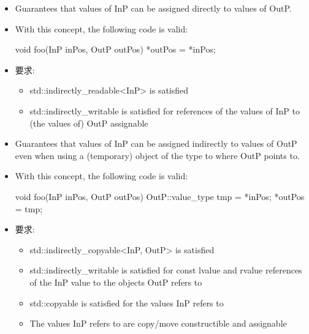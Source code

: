 
\begin{itemize}
\item
Guarantees that values of InP can be assigned directly to values of OutP.

\item
With this concept, the following code is valid:

\begin{cpp}
void foo(InP inPos, OutP outPos) {
	*outPos = *inPos;
}
\end{cpp}

\item
要求:
\begin{itemize}
\item
std::indirectly\_readable<InP> is satisfied

\item
std::indirectly\_writable is satisfied for references of the values of InP to (the values of) OutP assignable
\end{itemize}
\end{itemize}


\begin{itemize}
\item
Guarantees that values of InP can be assigned indirectly to values of OutP even when using a (temporary) object of the type to where OutP points to.

\item
With this concept, the following code is valid:

\begin{cpp}
void foo(InP inPos, OutP outPos) {
	OutP::value_type tmp = *inPos;
	*outPos = tmp;
}
\end{cpp}

\item
要求:
\begin{itemize}
\item
std::indirectly\_copyable<InP, OutP> is satisfied

\item
std::indirectly\_writable is satisfied for const lvalue and rvalue references of the InP value to the objects OutP refers to

\item
std::copyable is satisfied for the values InP refers to

\item
The values InP refers to are copy/move constructible and assignable
\end{itemize}
\end{itemize}

